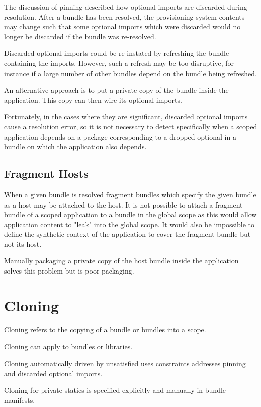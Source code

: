 \documentclass[a4paper,12pt]{article}
\begin{document}
The discussion of pinning described how optional imports are discarded during resolution.
After a bundle has been resolved, the provisioning system contents may change such
that some optional imports which were discarded
would no longer be discarded if the bundle was re-resolved.

Discarded optional imports could be re-instated by refreshing the bundle containing the imports.
However, such a refresh may be too disruptive, for instance if a large number of other bundles depend on the bundle being refreshed.

An alternative approach is to put a private copy of the bundle inside the application.
This copy can then wire its optional imports.

Fortunately, in the cases where they are significant, discarded optional imports
cause a resolution error, so it is not necessary to detect specifically when a scoped
application depends on a package corresponding to a dropped optional in a bundle
on which the application also depends.

\subsection{Fragment Hosts}

When a given bundle is resolved fragment bundles which specify the given bundle as a
host may be attached to the host.
It is not possible to attach a fragment bundle of a scoped application to a bundle in the
global scope as this would allow application content to "leak" into the global scope.
It would also be impossible to define the synthetic context of the application to cover the
fragment bundle but not its host.

Manually packaging a private copy of the host bundle inside the application solves this
problem but is poor packaging.

\clearpage
\section{Cloning}

Cloning refers to the copying of a bundle or bundles into a scope.

Cloning can apply to bundles or libraries.

Cloning automatically driven by unsatisfied uses constraints addresses pinning and discarded optional
imports.

Cloning for private statics is specified explicitly and manually in bundle manifests.
\end{document}
